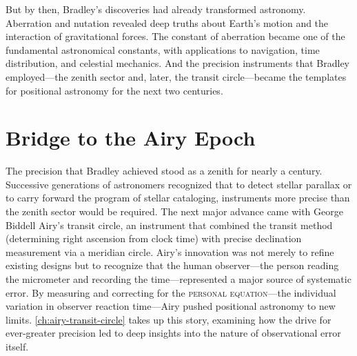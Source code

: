 But by then, Bradley's discoveries had already transformed astronomy. Aberration and nutation revealed deep truths about Earth's motion and the interaction of gravitational forces. The constant of aberration became one of the fundamental astronomical constants, with applications to navigation, time distribution, and celestial mechanics. And the precision instruments that Bradley employed—the zenith sector and, later, the transit circle—became the templates for positional astronomy for the next two centuries.

\section{Bridge to the Airy Epoch}

The precision that Bradley achieved stood as a zenith for nearly a century. Successive generations of astronomers recognized that to detect stellar parallax or to carry forward the program of stellar cataloging, instruments more precise than the zenith sector would be required. The next major advance came with George Biddell Airy's transit circle, an instrument that combined the transit method (determining right ascension from clock time) with precise declination measurement via a meridian circle. Airy's innovation was not merely to refine existing designs but to recognize that the human observer—the person reading the micrometer and recording the time—represented a major source of systematic error. By measuring and correcting for the \textsc{personal equation}—the individual variation in observer reaction time—Airy pushed positional astronomy to new limits. \cref{ch:airy-transit-circle} takes up this story, examining how the drive for ever-greater precision led to deep insights into the nature of observational error itself.
